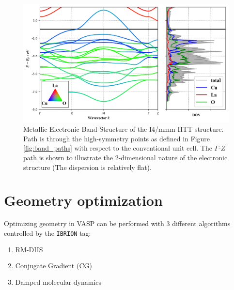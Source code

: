 
\begin{figure}
    \centering
    \includegraphics[width=\textwidth]{fig/simulation/bs_metal.png}
    \caption[GGA: Metallic Electronic Band Structure]{Metallic Electronic Band Structure of the I4/mmm HTT structure. Path is through the high-symmetry points as defined in Figure \ref{fig:band_paths} with respect to the conventional unit cell. The $\Gamma$-$Z$ path is shown to illustrate the 2-dimensional nature of the electronic structure (The dispersion is relatively flat).}
    \label{fig:bs_metal}
\end{figure}

\section{Geometry optimization}
Optimizing geometry in VASP can be performed with 3 different algorithms controlled by the \texttt{IBRION} tag:

\begin{enumerate}
	\item RM-DIIS
	\item Conjugate Gradient (CG)
	\item Damped molecular dynamics
\end{enumerate}

